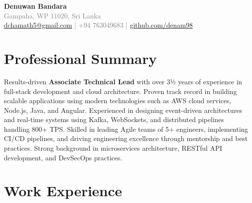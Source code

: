 \documentclass[11pt,a4paper]{article}
\begin{document}
\begin{center}
    {\LARGE \textbf{Denuwan Bandara}} \\[4pt]
    \textcolor{graytext}{Gampaha, WP 11020, Sri Lanka} \\
    \textcolor{graytext}{\href{mailto:dchamath5@gmail.com}{dchamath5@gmail.com} \quad | \quad +94 763049683 \quad | \quad \href{https://github.com/denam98}{github.com/denam98}} \\[8pt]
\end{center}

\section*{Professional Summary}
Results-driven \textbf{Associate Technical Lead} with over 3½ years of experience in full-stack development and cloud architecture. Proven track record in building scalable applications using modern technologies such as AWS cloud services, Node.js, Java, and Angular. Experienced in designing event-driven architectures and real-time systems using Kafka, WebSockets, and distributed pipelines handling 800+ TPS. Skilled in leading Agile teams of 5+ engineers, implementing CI/CD pipelines, and driving engineering excellence through mentorship and best practices. Strong background in microservices architecture, RESTful API development, and DevSecOps practices.

\section*{Work Experience}
\end{document}
